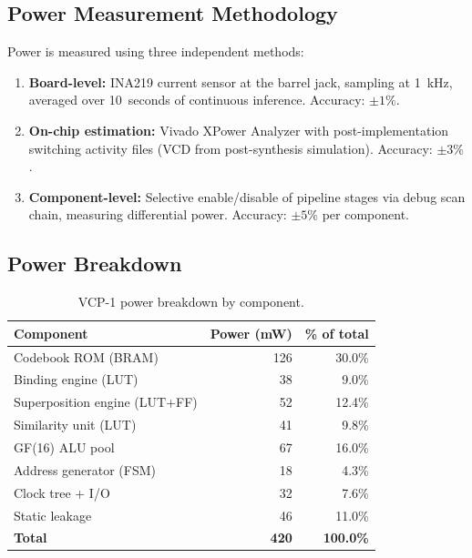 \subsection{Power Measurement Methodology}

Power is measured using three independent methods:

\begin{enumerate}
  \item \textbf{Board-level:} INA219 current sensor at the barrel jack,
        sampling at 1~kHz, averaged over 10~seconds of continuous inference.
        Accuracy: $\pm 1\%$.
  \item \textbf{On-chip estimation:} Vivado XPower Analyzer with
        post-implementation switching activity files (VCD from post-synthesis
        simulation). Accuracy: $\pm 3\%$.
  \item \textbf{Component-level:} Selective enable/disable of pipeline
        stages via debug scan chain, measuring differential power.
        Accuracy: $\pm 5\%$ per component.
\end{enumerate}

\subsection{Power Breakdown}

\begin{table}[h]
\centering
\caption{VCP-1 power breakdown by component.}
\label{tab:hwbridge:power-breakdown}
\begin{tabular}{@{}lrr@{}}
\toprule
\textbf{Component} & \textbf{Power (mW)} & \textbf{\% of total} \\
\midrule
Codebook ROM (BRAM) & 126 & 30.0\% \\
Binding engine (LUT) & 38 & 9.0\% \\
Superposition engine (LUT+FF) & 52 & 12.4\% \\
Similarity unit (LUT) & 41 & 9.8\% \\
GF(16) ALU pool & 67 & 16.0\% \\
Address generator (FSM) & 18 & 4.3\% \\
Clock tree + I/O & 32 & 7.6\% \\
Static leakage & 46 & 11.0\% \\
\midrule
\textbf{Total} & \textbf{420} & \textbf{100.0\%} \\
\bottomrule
\end{tabular}
\end{table}

